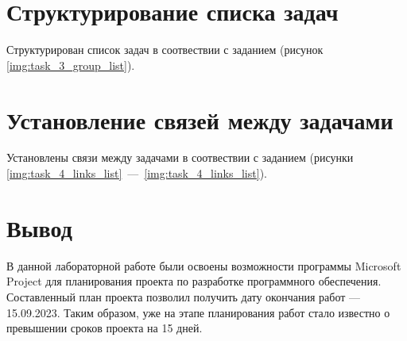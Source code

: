 \clearpage
\section{Структурирование списка задач}

Структурирован список задач в соотвествии с заданием (рисунок \ref{img:task_3_group_list}).

\clearpage
\section{Установление связей между задачами}

Установлены связи между задачами в соотвествии с заданием (рисунки \ref{img:task_4_links_list}~---~\ref{img:task_4_links_list}).

\section{Вывод}

В данной лабораторной работе были освоены возможности программы Microsoft
Project для планирования проекта по разработке программного обеспечения. Составленный план проекта 
позволил получить дату окончания работ --- 15.09.2023. Таким образом, уже на этапе планирования работ
стало известно о превышении сроков проекта на 15 дней.